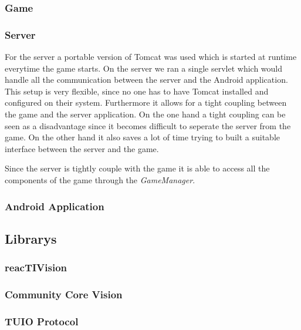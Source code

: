 \documentclass[a4paper,10pt]{article}
\begin{document}
		\subsubsection{Game}
		
		
		\subsubsection{Server}
		For the server a portable version of Tomcat was used which is started at runtime everytime the game starts.
		On the server we ran a single servlet which would handle all the communication between the server and the Android application.
		This setup is very flexible, since no one has to have Tomcat installed and configured on their system.
		Furthermore it allows for a tight coupling between the game and the server application.
		On the one hand a tight coupling can be seen as a disadvantage since it becomes difficult to seperate the server from the game.
		On the other hand it also saves a lot of time trying to built a suitable interface between the server and the game.
				
		Since the server is tightly couple with the game it is able to access all the components of the game through the \emph{GameManager}.
		
		\subsubsection{Android Application}
		
	\subsection{Librarys}%
		\subsubsection{reacTIVision}
		\subsubsection{Community Core Vision}
	
		\subsubsection{TUIO Protocol}
		
\end{document}
